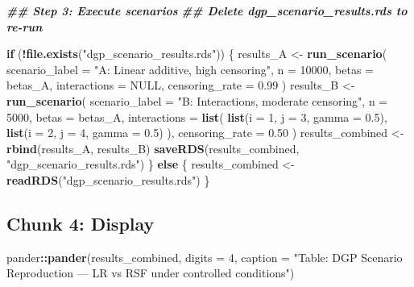 \documentclass[
]{article}
\newenvironment{Shaded}{\begin{snugshade}}{\end{snugshade}}
\newcommand{\AttributeTok}[1]{\textcolor[rgb]{0.13,0.29,0.53}{#1}}
\newcommand{\ConstantTok}[1]{\textcolor[rgb]{0.56,0.35,0.01}{#1}}
\newcommand{\ControlFlowTok}[1]{\textcolor[rgb]{0.13,0.29,0.53}{\textbf{#1}}}
\newcommand{\DecValTok}[1]{\textcolor[rgb]{0.00,0.00,0.81}{#1}}
\newcommand{\DocumentationTok}[1]{\textcolor[rgb]{0.56,0.35,0.01}{\textbf{\textit{#1}}}}
\newcommand{\FloatTok}[1]{\textcolor[rgb]{0.00,0.00,0.81}{#1}}
\newcommand{\FunctionTok}[1]{\textcolor[rgb]{0.13,0.29,0.53}{\textbf{#1}}}
\newcommand{\NormalTok}[1]{#1}
\newcommand{\OtherTok}[1]{\textcolor[rgb]{0.56,0.35,0.01}{#1}}
\newcommand{\SpecialCharTok}[1]{\textcolor[rgb]{0.81,0.36,0.00}{\textbf{#1}}}
\newcommand{\StringTok}[1]{\textcolor[rgb]{0.31,0.60,0.02}{#1}}
\begin{document}
\begin{Shaded}
\begin{Highlighting}[]
\DocumentationTok{\#\# Step 3: Execute scenarios}
\DocumentationTok{\#\# Delete dgp\_scenario\_results.rds to re{-}run}

\ControlFlowTok{if}\NormalTok{ (}\SpecialCharTok{!}\FunctionTok{file.exists}\NormalTok{(}\StringTok{"dgp\_scenario\_results.rds"}\NormalTok{)) \{}
\NormalTok{  results\_A }\OtherTok{\textless{}{-}} \FunctionTok{run\_scenario}\NormalTok{(}
    \AttributeTok{scenario\_label =} \StringTok{"A: Linear additive, high censoring"}\NormalTok{,}
    \AttributeTok{n              =} \DecValTok{10000}\NormalTok{,}
    \AttributeTok{betas          =}\NormalTok{ betas\_A,}
    \AttributeTok{interactions   =} \ConstantTok{NULL}\NormalTok{,}
    \AttributeTok{censoring\_rate =} \FloatTok{0.99}
\NormalTok{  )}
\NormalTok{  results\_B }\OtherTok{\textless{}{-}} \FunctionTok{run\_scenario}\NormalTok{(}
    \AttributeTok{scenario\_label =} \StringTok{"B: Interactions, moderate censoring"}\NormalTok{,}
    \AttributeTok{n              =} \DecValTok{5000}\NormalTok{,}
    \AttributeTok{betas          =}\NormalTok{ betas\_A,}
    \AttributeTok{interactions   =} \FunctionTok{list}\NormalTok{(}
      \FunctionTok{list}\NormalTok{(}\AttributeTok{i =} \DecValTok{1}\NormalTok{, }\AttributeTok{j =} \DecValTok{3}\NormalTok{, }\AttributeTok{gamma =} \FloatTok{0.5}\NormalTok{),}
      \FunctionTok{list}\NormalTok{(}\AttributeTok{i =} \DecValTok{2}\NormalTok{, }\AttributeTok{j =} \DecValTok{4}\NormalTok{, }\AttributeTok{gamma =} \FloatTok{0.5}\NormalTok{)}
\NormalTok{    ),}
    \AttributeTok{censoring\_rate =} \FloatTok{0.50}
\NormalTok{  )}
\NormalTok{  results\_combined }\OtherTok{\textless{}{-}} \FunctionTok{rbind}\NormalTok{(results\_A, results\_B)}
  \FunctionTok{saveRDS}\NormalTok{(results\_combined, }\StringTok{"dgp\_scenario\_results.rds"}\NormalTok{)}
\NormalTok{\} }\ControlFlowTok{else}\NormalTok{ \{}
\NormalTok{  results\_combined }\OtherTok{\textless{}{-}} \FunctionTok{readRDS}\NormalTok{(}\StringTok{"dgp\_scenario\_results.rds"}\NormalTok{)}
\NormalTok{\}}
\end{Highlighting}
\end{Shaded}

\subsection{Chunk 4: Display}\label{chunk-4-display}

\begin{Shaded}
\begin{Highlighting}[]
\NormalTok{pander}\SpecialCharTok{::}\FunctionTok{pander}\NormalTok{(results\_combined, }\AttributeTok{digits =} \DecValTok{4}\NormalTok{,}
       \AttributeTok{caption =} \StringTok{"Table: DGP Scenario Reproduction — LR vs RSF under controlled conditions"}\NormalTok{)}
\end{Highlighting}
\end{Shaded}
\end{document}
